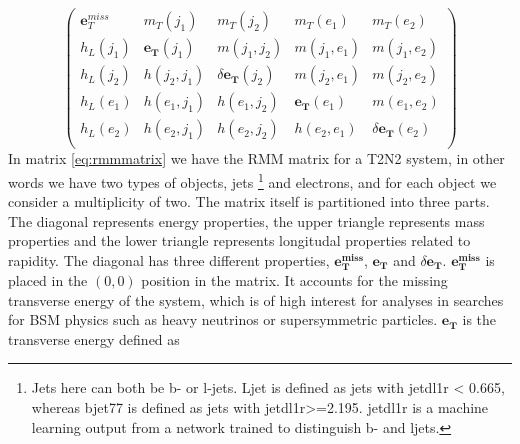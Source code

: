 \begin{equation}\label{eq:rmmmatrix}
\begin{pmatrix}
    \boldsymbol{e}_{T}^{miss} & m_T(j_1) & m_T(j_2) &  m_T(e_1) &  m_T(e_2)\\
    h_L(j_1) & \boldsymbol{e_T}(j_1) & m(j_1, j_2) & m(j_1, e_1) & m(j_1, e_2)\\
    h_L(j_2) & h(j_2, j_1) & \delta \boldsymbol{e_T}(j_2)& m(j_2, e_1) & m(j_2, e_2)\\
    h_L(e_1) & h(e_1, j_1) & h(e_1, j_2) & \boldsymbol{e_T}(e_1) & m(e_1, e_2)\\
    h_L(e_2) & h(e_2, j_1) & h(e_2, j_2) & h(e_2, e_1) & \delta \boldsymbol{e_T}(e_2)\\
\end{pmatrix}
\end{equation}
\newline
In matrix \ref{eq:rmmmatrix} we have the RMM matrix for a T2N2 system, in other words we have two types of objects, jets
\footnote{Jets here can both be b- or l-jets. Ljet is defined as jets with jetdl1r < 0.665, whereas bjet77 is defined as jets with jetdl1r>=2.195. 
jetdl1r is a machine learning output from a network trained to distinguish b- and ljets.} and electrons, and for each object we consider a multiplicity of two. 
The matrix itself is partitioned into three parts. 
The diagonal represents energy properties, the upper triangle represents mass properties and the lower triangle represents longitudal 
properties related to rapidity. The diagonal has three different properties, $\boldsymbol{e_T^{miss}}$, $\boldsymbol{e_T}$ and $\delta\boldsymbol{e_T}$. 
$\boldsymbol{e_T^{miss}}$ is placed in the $(0,0)$ position in the matrix. It accounts for the missing transverse energy of the system, which is of 
high interest for analyses in searches for BSM physics such as heavy neutrinos or supersymmetric particles. $\boldsymbol{e_T}$ is the transverse energy defined as 

